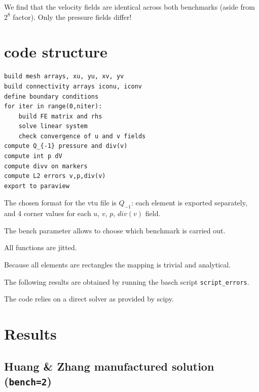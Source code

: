 We find that the velocity fields are identical across 
both benchmarks (aside from $2^8$ factor). Only the pressure fields differ!

\section*{code structure}

\begin{verbatim}
build mesh arrays, xu, yu, xv, yv
build connectivity arrays iconu, iconv
define boundary conditions
for iter in range(0,niter):
    build FE matrix and rhs
    solve linear system
    check convergence of u and v fields
compute Q_{-1} pressure and div(v)
compute int p dV
compute divv on markers
compute L2 errors v,p,div(v)
export to paraview
\end{verbatim}
The chosen format for the vtu file is $Q_{-1}$: each element
is exported separately, and 4 corner values for 
each $u$, $v$, $p$, $div(v)$ field.

The {\python bench} parameter allows to choose 
which benchmark is carried out.

All functions are jitted.

Because all elements are rectangles the mapping is trivial
and analytical. 

The following results are obtained by running the basch script
{\tt script\_errors}.

The code relies on a direct solver as provided by scipy.

\newpage
\section*{Results}

\subsection*{Huang \& Zhang manufactured solution ({\tt bench=2})}

